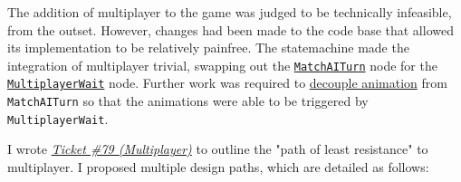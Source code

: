 \documentclass[11pt,a4paper]{report}
\begin{document}
The addition of multiplayer to the game was judged to be technically infeasible, from the outset. However, changes had been made to the code base that allowed its implementation to be relatively painfree. The statemachine made the integration of multiplayer trivial, swapping out the \href{https://github.com/UQdeco2800/deco2800-2016-pyramidscheme/blob/master/pyramidscheme/src/main/java/uq/deco2800/pyramidscheme/controllers/statemachine/MatchAITurn.java}{\texttt{MatchAITurn}} node for the \href{https://github.com/UQdeco2800/deco2800-2016-pyramidscheme/blob/master/pyramidscheme/src/main/java/uq/deco2800/pyramidscheme/controllers/statemachine/MultiplayerWait.java}{\texttt{MultiplayerWait}} node. Further work was required to \href{https://github.com/UQdeco2800/deco2800-2016-pyramidscheme/tree/master/pyramidscheme/src/main/java/uq/deco2800/pyramidscheme/animations}{decouple animation} from \texttt{MatchAITurn} so that the animations were able to be triggered by \texttt{MultiplayerWait}.

I wrote \href{https://github.com/UQdeco2800/deco2800-2016-pyramidscheme/issues/79}{\textit{Ticket \#79 (Multiplayer)}} to outline the "path of least resistance" to multiplayer. I proposed multiple design paths, which are detailed as follows:
\end{document}
